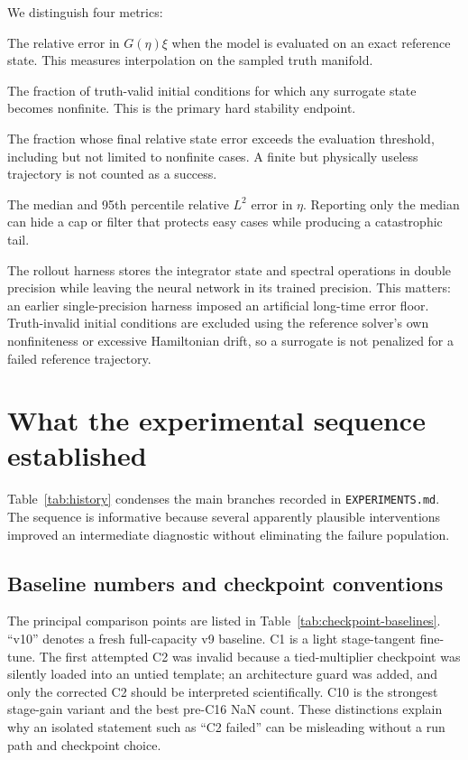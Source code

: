 \documentclass[11pt]{article}
\begin{document}
We distinguish four metrics:
\begin{description}[style=nextline,leftmargin=0pt]
\item[One-step DNO error]
The relative error in \(G(\eta)\xi\) when the model is evaluated on an exact
reference state.  This measures interpolation on the sampled truth manifold.
\item[NaN rate]
The fraction of truth-valid initial conditions for which any surrogate state
becomes nonfinite.  This is the primary hard stability endpoint.
\item[Divergence rate]
The fraction whose final relative state error exceeds the evaluation threshold,
including but not limited to nonfinite cases.  A finite but physically useless
trajectory is not counted as a success.
\item[Final-time error distribution]
The median and 95th percentile relative \(L^2\) error in \(\eta\).  Reporting
only the median can hide a cap or filter that protects easy cases while
producing a catastrophic tail.
\end{description}

The rollout harness stores the integrator state and spectral operations in
double precision while leaving the neural network in its trained precision.
This matters: an earlier single-precision harness imposed an artificial
long-time error floor.  Truth-invalid initial conditions are excluded using
the reference solver's own nonfiniteness or excessive Hamiltonian drift, so a
surrogate is not penalized for a failed reference trajectory.

\section{What the experimental sequence established}

Table~\ref{tab:history} condenses the main branches recorded in
\texttt{EXPERIMENTS.md}.  The sequence is informative because several
apparently plausible interventions improved an intermediate diagnostic without
eliminating the failure population.

\subsection{Baseline numbers and checkpoint conventions}

The principal comparison points are listed in
Table~\ref{tab:checkpoint-baselines}.  ``v10'' denotes a fresh full-capacity v9
baseline.  C1 is a light stage-tangent fine-tune.  The first attempted C2 was
invalid because a tied-multiplier checkpoint was silently loaded into an
untied template; an architecture guard was added, and only the corrected C2
should be interpreted scientifically.  C10 is the strongest stage-gain variant
and the best pre-C16 NaN count.  These distinctions explain why an isolated
statement such as ``C2 failed'' can be misleading without a run path and
checkpoint choice.
\end{document}
